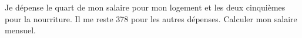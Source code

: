 Je dépense le quart de mon salaire pour mon logement et les deux cinquièmes pour la nourriture. 
Il me reste \qty{378}{\EURO} pour les autres dépenses. Calculer mon salaire mensuel.